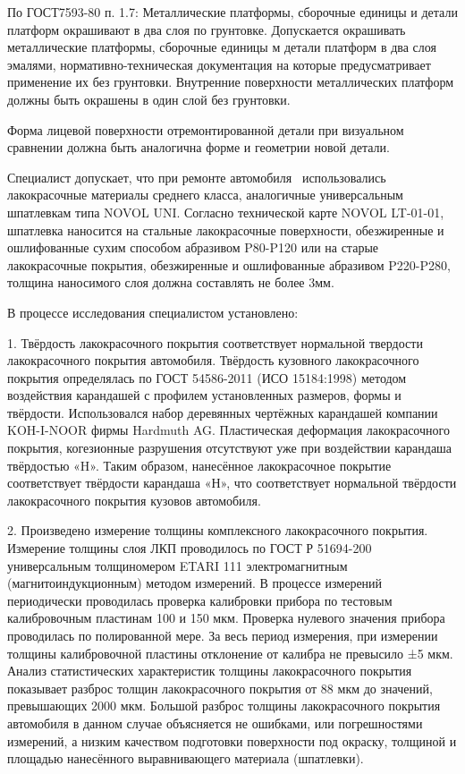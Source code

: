 {%

По ГОСТ7593-80 п. 1.7: Металлические платформы,
сборочные единицы и детали платформ окрашивают в два слоя по грунтовке. Допускается
окрашивать металлические платформы, сборочные единицы м детали платформ в два слоя
эмалями, нормативно-техническая документация на которые предусматривает применение
их без грунтовки. Внутренние поверхности металлических платформ должны быть
окрашены в один слой без грунтовки. 

Форма лицевой поверхности отремонтированной
детали при визуальном сравнении должна быть аналогична форме и геометрии новой
детали.


Специалист допускает, что при ремонте автомобиля \, использовались лакокрасочные материалы среднего класса, аналогичные универсальным шпатлевкам типа NOVOL UNI.  Согласно технической карте NOVOL LT-01-01, шпатлевка наносится на стальные лакокрасочные поверхности, обезжиренные и ошлифованные сухим способом абразивом P80-P120 или на старые лакокрасочные покрытия, обезжиренные и ошлифованные абразивом P220-P280, толщина наносимого слоя  должна составлять не более 3мм. 




  \noindent В процессе исследования специалистом установлено:
  
  1.  Твёрдость лакокрасочного покрытия соответствует нормальной твердости лакокрасочного покрытия автомобиля. Твёрдость кузовного
  лакокрасочного покрытия определялась по ГОСТ 54586-2011 (ИСО 15184:1998) методом
  воздействия карандашей с профилем установленных размеров, формы и твёрдости.
  Использовался набор деревянных чертёжных карандашей компании KOH-I-NOOR фирмы
  Hardmuth AG. Пластическая деформация лакокрасочного покрытия, когезионные
  разрушения отсутствуют уже при воздействии карандаша твёрдостью «H». Таким образом,
  нанесённое лакокрасочное покрытие соответствует твёрдости карандаша «Н», что
  соответствует нормальной твёрдости лакокрасочного покрытия кузовов автомобиля.
  
  
  2. Произведено измерение толщины комплексного лакокрасочного покрытия.
  Измерение толщины слоя ЛКП проводилось по ГОСТ Р 51694-200 универсальным
  толщиномером ETARI 111 электромагнитным (магнитоиндукционным) методом измерений.
  В процессе измерений периодически проводилась проверка калибровки прибора по тестовым
  калибровочным пластинам 100 и 150 мкм. Проверка нулевого значения прибора проводилась
  по полированной мере. За весь период измерения, при измерении толщины калибровочной
  пластины отклонение от калибра не превысило ±5 мкм. 
  Анализ статистических характеристик толщины лакокрасочного покрытия показывает
  разброс толщин лакокрасочного покрытия от 88 мкм до значений, превышающих 2000 мкм.
  Большой разброс толщины лакокрасочного покрытия автомобиля в данном случае
  объясняется не ошибками, или погрешностями измерений, а низким качеством подготовки
  поверхности под окраску, толщиной и площадью нанесённого выравнивающего материала
  (шпатлевки).
  
}
